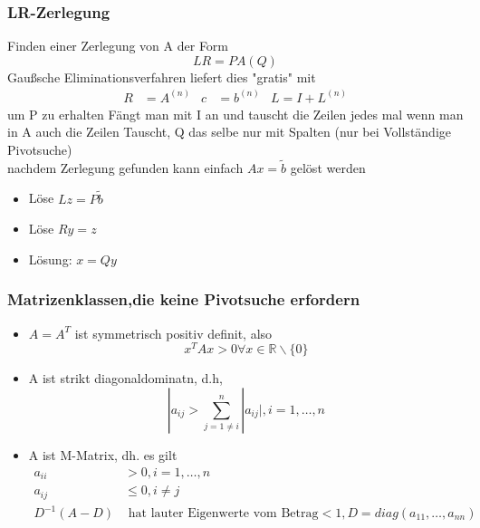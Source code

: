 \documentclass[
	ngerman,
	accentcolor=9c,%
	type=intern,
	marginpar=false
	]{tudapub}
\begin{document}
        \subsubsection{LR-Zerlegung}
            Finden einer Zerlegung von A der Form
            \begin{equation*}
                LR = PA(Q)
            \end{equation*}
            Gaußsche Eliminationsverfahren liefert dies "gratis" mit
            \begin{align*}
                R &= A^{(n)} & c &= b^{(n)} & L = I + L^{(n)}
            \end{align*}
            um P zu erhalten Fängt man mit I an und tauscht die Zeilen jedes mal wenn man in A auch die Zeilen Tauscht, Q das selbe nur mit Spalten (nur bei Vollständige Pivotsuche) \\
            nachdem Zerlegung gefunden kann einfach $Ax = \tilde{b}$ gelöst werden
            \begin{itemize}
                \item Löse $Lz = P\tilde{b}$
                \item Löse $Ry = z$
                \item Lösung: $x=Qy$
            \end{itemize}
        \subsubsection{Matrizenklassen,die keine Pivotsuche erfordern}
            \begin{itemize}
                \item $A=A^T$ ist symmetrisch positiv definit, also
                \begin{equation*}
                    x^TAx>0 \forall x \in \mathbb{R} \backslash \{0\}
                \end{equation*}
                \item A ist strikt diagonaldominatn, d.h,
                \begin{equation*}
                    |a_{ij} > \sum_{j=1\not=i}^n|a_{ij}|, i= 1,\dots,n
                \end{equation*}
                
                \item  A ist M-Matrix, dh. es gilt
                \begin{align*}
                    a_{ii} &> 0, i = 1,\dots,n\\
                    a_{ij} &\leq 0, i \not= j\\
                    D^{-1}(A-D) & \text{ hat lauter Eigenwerte vom Betrag} < 1, D=diag(a_{11},\dots,a_{nn})
                \end{align*}
            \end{itemize}
\end{document}
